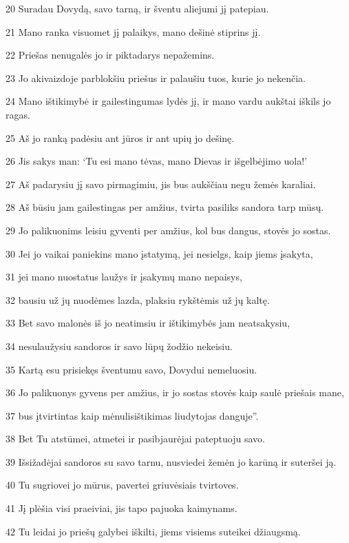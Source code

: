 \par 20 Suradau Dovydą, savo tarną, ir šventu aliejumi jį patepiau. 
\par 21 Mano ranka visuomet jį palaikys, mano dešinė stiprins jį. 
\par 22 Priešas nenugalės jo ir piktadarys nepažemins. 
\par 23 Jo akivaizdoje parblokšiu priešus ir palaušiu tuos, kurie jo nekenčia. 
\par 24 Mano ištikimybė ir gailestingumas lydės jį, ir mano vardu aukštai iškils jo ragas. 
\par 25 Aš jo ranką padėsiu ant jūros ir ant upių jo dešinę. 
\par 26 Jis sakys man: ‘Tu esi mano tėvas, mano Dievas ir išgelbėjimo uola!’ 
\par 27 Aš padarysiu jį savo pirmagimiu, jis bus aukščiau negu žemės karaliai. 
\par 28 Aš būsiu jam gailestingas per amžius, tvirta pasiliks sandora tarp mūsų. 
\par 29 Jo palikuonims leisiu gyventi per amžius, kol bus dangus, stovės jo sostas. 
\par 30 Jei jo vaikai paniekins mano įstatymą, jei nesielgs, kaip jiems įsakyta, 
\par 31 jei mano nuostatus laužys ir įsakymų mano nepaisys, 
\par 32 bausiu už jų nuodėmes lazda, plaksiu rykštėmis už jų kaltę. 
\par 33 Bet savo malonės iš jo neatimsiu ir ištikimybės jam neatsakysiu, 
\par 34 nesulaužysiu sandoros ir savo lūpų žodžio nekeisiu. 
\par 35 Kartą esu prisiekęs šventumu savo, Dovydui nemeluosiu. 
\par 36 Jo palikuonys gyvens per amžius, ir jo sostas stovės kaip saulė priešais mane, 
\par 37 bus įtvirtintas kaip mėnulis­ištikimas liudytojas danguje”. 
\par 38 Bet Tu atstūmei, atmetei ir pasibjaurėjai pateptuoju savo. 
\par 39 Išsižadėjai sandoros su savo tarnu, nusviedei žemėn jo karūną ir suteršei ją. 
\par 40 Tu sugriovei jo mūrus, pavertei griuvėsiais tvirtoves. 
\par 41 Jį plėšia visi praeiviai, jis tapo pajuoka kaimynams. 
\par 42 Tu leidai jo priešų galybei iškilti, jiems visiems suteikei džiaugsmą. 

